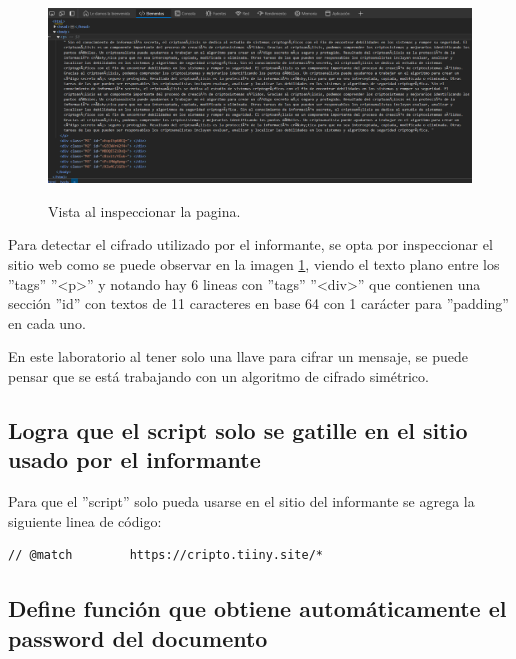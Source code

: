 \documentclass[letter,12pt]{article}
\begin{document}
    \begin{figure}[H]
        \centering
        \includegraphics[width=15cm]{img/parte 1/2.1.png}
        \label{fig: 2.1}
        \caption{Vista al inspeccionar la pagina.}
    \end{figure}


Para detectar el cifrado utilizado por el informante, se opta por inspeccionar el sitio web como se puede observar en la imagen \ref{fig: 2.1}, viendo el texto plano entre los ''tags'' ''<p>'' y notando hay 6 lineas con ''tags'' ''<div>'' que contienen una sección ''id'' con textos de 11 caracteres en base 64 con 1 carácter para ''padding'' en cada uno.\newline

En este laboratorio al tener solo una llave para cifrar un mensaje, se puede pensar que se está trabajando con un algoritmo de cifrado simétrico. 




\subsection{Logra que el script solo se gatille en el sitio usado por el informante}

Para que el ''script'' solo pueda usarse en el sitio del informante se agrega la siguiente linea de código:

\begin{lstlisting}
// @match        https://cripto.tiiny.site/*
\end{lstlisting}


\subsection{Define función que obtiene automáticamente el password del documento}
\end{document}
